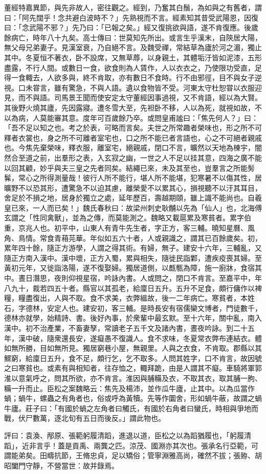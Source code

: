 \begin{pinyinscope}
董經特嘉異節，與先非故人，密往觀之。經到，乃奮其白鬚，為如與之有舊者，謂曰：「阿先闊乎！念共避白波時不？」先熟視而不言。經素知其昔受武陽恩，因復曰：「念武陽不邪？」先乃曰：「已報之矣。」經又復挑欲與語，遂不肯復應。後歲餘病亡，時年八十九矣。高士傳曰：世莫知先所出。或言生乎漢末，自陝居大陽，無父母兄弟妻子。見漢室衰，乃自絕不言。及魏受禪，常結草為廬於河之湄，獨止其中。冬夏恒不著衣，卧不設席，又無草蓐，以身親土，其體垢汙皆如泥漆，五形盡露，不行人間。或數日一食，欲食則為人賃作，人以衣衣之，乃使限功受直，足得一食輙去，人欲多與，終不肯取，亦有數日不食時。行不由邪徑，目不與女子逆視。口未甞言，雖有驚急，不與人語。遺以食物皆不受。河東太守杜恕甞以衣服迎見，而不與語。司馬景王聞而使安定太守董經因事過視，又不肯語，經以為大賢。其後野火燒其廬，先因露寢。遭冬雪大至，先袒卧不移，人以為死，就視如故，不以為病，人莫能審其意。度年可百歲餘乃卒。或問皇甫謐曰：「焦先何人？」曰：「吾不足以知之也。考之於表，可略而言矣。夫世之所常趣者榮味也，形之所不可釋者衣裳也，身之所不可離者室宅也，口之所不能已者言語也，心之不可絕者親戚也。今焦先棄榮味，釋衣服，離室宅，絕親戚，閉口不言，曠然以天地為棟宇，闇然合至道之前，出羣形之表，入玄寂之幽，一世之人不足以挂其意，四海之廣不能以回其顧，妙乎與夫三皇之先者同矣。結繩已來，未及其至也，豈羣言之所能髣髴，常心之所得測量哉！彼行人所不能行，堪人所不能堪，犯寒暑不以傷其性，居曠野不以恐其形，遭驚急不以迫其慮，離榮愛不以累其心，損視聽不以汙其耳目，舍足於不損之地，居身於獨立之處，延年歷百，壽越期頤，雖上識不能尚也。自羲皇已來，一人而已矣！」魏氏春秋曰：故梁州刺史耿黼以先為「仙人」也，北海傅玄謂之「性同禽獸」，並為之傳，而莫能測之。魏略又載扈累及寒貧者。累字伯重，京兆人也。初平中，山東人有青牛先生者，字正方，客三輔。曉知星曆、風角、鳥情。常食青葙芫華。年似如五六十者，人或親識之，謂其已百餘歲矣。初，累年四十餘，隨正方游學，人謂之得其術。有婦，無子。建安十六年，三輔亂，又隨正方南入漢中。漢中壞，正方入蜀，累與相失，隨徙民詣鄴，遭疾疫喪其婦。至黃初元年，又徙詣洛陽，遂不復娶婦。獨居道側，以㼾甎為障，施一廚牀，食宿其中。晝日潛思，夜則仰視星宿，吟詠內書。人或問之，閉口不肯言。至嘉平中，年八九十，裁若四五十者。縣官以其孤老，給廩日五升。五升不足食，頗行傭作以裨糧，糧盡復出，人與不取。食不求美，衣弊縕故，後一二年病亡。寒貧者，本姓石，字德林，安定人也。建安初，客三輔。是時長安有宿儒欒文博者，門徒數千，德林亦就學，始精詩、書。後好內事，於衆輩中最玄默。至十六年，關中亂，南入漢中。初不治產業，不畜妻孥，常讀老子五千文及諸內書，晝夜吟詠。到二十五年，漢中破，隨衆還長安，遂癡愚不復識人。食不求味，冬夏常衣弊布連結衣。體如無所勝，目如無所見。獨居窮巷小屋，無親里。人與之衣食，不肯取。郡縣以其鰥窮，給廩日五升，食不足，頗行乞，乞不取多。人問其姓字，口不肯言，故因號之曰寒貧也。或素有與相知者，往存恤之，輙拜跪，由是人謂其不癡。車騎將軍郭淮以意氣呼之，問其所欲，亦不肯言。淮因與脯糒及衣，不取其衣，取其脯一朐、糒一升而止。臣松之案魏略云：焦先及楊沛，並作瓜牛廬，止其中。以為瓜當作蝸；蝸牛，螺蟲之有角者也，俗或呼為黃犢。先等作圜舍，形如蝸牛蔽，故謂之蝸牛廬。莊子曰：「有國於蝸之左角者曰觸氏，有國於右角者曰蠻氏，時相與爭地而戰，伏尸數萬，逐北旬有五日而後反。」謂此物也。

評曰：袁渙、邴原、張範躬履清蹈，進退以道，臣松之以為蹈猶履也，「躬履清蹈」，近非言乎！蓋是貢禹、兩龔之匹。涼茂、國淵亦其次也。張承名行亞範，可謂能弟矣。田疇抗節，王脩忠貞，足以矯俗；管寧淵雅高尚，確然不拔；張臶、胡昭闔門守靜，不營當世：故并錄焉。


\end{pinyinscope}